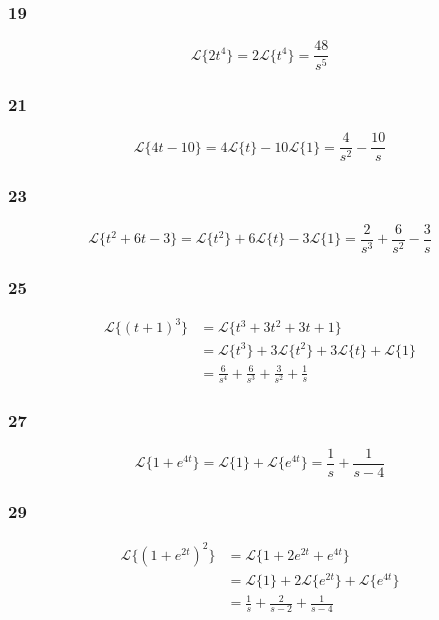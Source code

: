 \documentclass{article}
\begin{document}
\subsubsection{19}

\[\mathcal{L}\{2 t^4\} = 2 \mathcal{L}\{t^4\} = \frac{48}{s^5}\]

\subsubsection{21}

\[\mathcal{L}\{4 t - 10\} = 4 \mathcal{L}\{t\} - 10 \mathcal{L}\{1\} = \frac{4}{s^2} - \frac{10}{s}\]

\subsubsection{23}

\[\mathcal{L}\{t^2 + 6 t - 3\} = \mathcal{L}\{t^2\} + 6 \mathcal{L}\{t\} - 3 \mathcal{L}\{1\} = \frac{2}{s^3} + \frac{6}{s^2} - \frac{3}{s}\]

\subsubsection{25}

\begin{align*}
  \mathcal{L}\{(t + 1)^3\} & = \mathcal{L}\{t^3 + 3 t^2 + 3 t + 1\}                                              \\
                           & = \mathcal{L}\{t^3\} + 3 \mathcal{L}\{t^2\} + 3 \mathcal{L}\{t\} + \mathcal{L}\{1\} \\
                           & = \frac{6}{s^4} + \frac{6}{s^3} + \frac{3}{s^2} + \frac{1}{s}
\end{align*}

\subsubsection{27}

\[\mathcal{L}\{1 + e^{4 t}\} = \mathcal{L}\{1\} + \mathcal{L}\{e^{4 t}\} = \frac{1}{s} + \frac{1}{s - 4}\]

\subsubsection{29}

\begin{align*}
  \mathcal{L}\{(1 + e^{2 t})^2\} & = \mathcal{L}\{1 + 2 e^{2 t} + e^{4 t}\}                               \\
                                 & = \mathcal{L}\{1\} + 2 \mathcal{L}\{e^{2 t}\} + \mathcal{L}\{e^{4 t}\} \\
                                 & = \frac{1}{s} + \frac{2}{s - 2} + \frac{1}{s - 4}
\end{align*}
\end{document}
